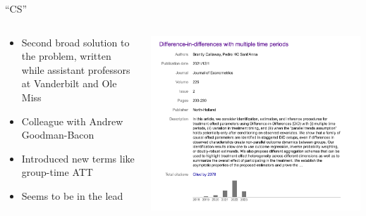 \documentclass{beamer}
\begin{document}
\begin{frame}{``CS''}
  \begin{columns}
    \begin{column}{0.5\textwidth}
      \begin{itemize}
\item Second broad solution to the problem, written while assistant professors at Vanderbilt and Ole Miss
\item Colleague with Andrew Goodman-Bacon
\item Introduced new terms like group-time ATT
\item Seems to be in the lead
      \end{itemize}
    \end{column}
    \begin{column}{0.5\textwidth}
      \includegraphics[scale=0.25]{./lecture_includes/pedro_cites}
    \end{column}
  \end{columns}
\end{frame}
\end{document}
